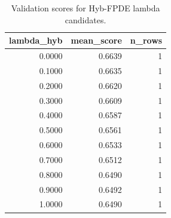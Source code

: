 \begin{table}[t]
\caption{Validation scores for Hyb-FPDE lambda candidates.}
\label{tab:lambda_distribution_computed}
\centering
\begin{tabular}{rrr}
\toprule
lambda\_hyb & mean\_score & n\_rows \\
\midrule
0.0000 & 0.6639 & 1 \\
0.1000 & 0.6635 & 1 \\
0.2000 & 0.6620 & 1 \\
0.3000 & 0.6609 & 1 \\
0.4000 & 0.6587 & 1 \\
0.5000 & 0.6561 & 1 \\
0.6000 & 0.6533 & 1 \\
0.7000 & 0.6512 & 1 \\
0.8000 & 0.6490 & 1 \\
0.9000 & 0.6492 & 1 \\
1.0000 & 0.6490 & 1 \\
\bottomrule
\end{tabular}

\end{table}
